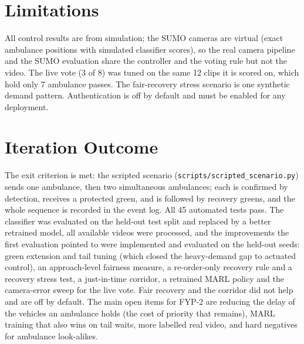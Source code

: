 \section{Limitations}
All control results are from simulation; the SUMO cameras are virtual (exact ambulance positions with
simulated classifier scores), so the real camera pipeline and the SUMO evaluation share the controller and the
voting rule but not the video. The live vote (3 of 8) was tuned on the same 12 clips it is scored on, which
hold only 7 ambulance passes. The fair-recovery stress scenario is one synthetic demand pattern. Authentication
is off by default and must be enabled for any deployment.

\section{Iteration Outcome}
The exit criterion is met: the scripted scenario (\texttt{scripts/scripted\_scenario.py}) sends one ambulance,
then two simultaneous ambulances; each is confirmed by detection, receives a protected green, and is followed
by recovery greens, and the whole sequence is recorded in the event log. All 45 automated tests pass. The classifier
was evaluated on the held-out test split and replaced by a better retrained model, all available videos were
processed, and the improvements the first evaluation pointed to were implemented and evaluated on the held-out
seeds: green extension and tail tuning (which closed the heavy-demand gap to actuated control), an approach-level
fairness measure, a re-order-only recovery rule and a recovery stress test, a just-in-time corridor, a retrained
MARL policy and the camera-error sweep for the live vote. Fair recovery and the corridor did not help and are off
by default. The main open items for FYP-2 are reducing the delay of the vehicles an ambulance holds (the cost of
priority that remains), MARL training that also wins on tail waits, more labelled real video, and hard negatives
for ambulance look-alikes.
